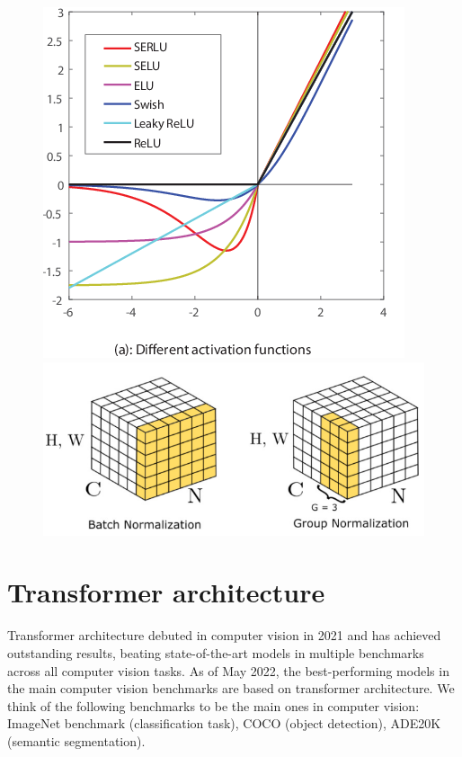 \begin{figure}
    \begin{floatrow}[2]
        {\includegraphics[width=\linewidth]{images/activation_functions.png}}\quad
        {\includegraphics[width=\linewidth]{images/group_batch_norm.png}}
    \end{floatrow}
\end{figure}



\section{Transformer architecture}
Transformer architecture debuted in computer vision in 2021 and has achieved outstanding results, beating state-of-the-art models in multiple benchmarks across all computer vision tasks. As of May 2022, the best-performing models in the main computer vision benchmarks are based on transformer architecture. We think of the following benchmarks to be the main ones in computer vision:  ImageNet benchmark (classification task), COCO (object detection), ADE20K (semantic segmentation).

